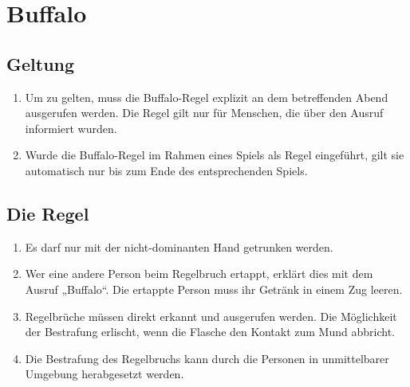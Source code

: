 \chapter{Buffalo}
\section{Geltung}
\begin{enumerate}[label={(\arabic*)}]
    \item
    Um zu gelten, muss die Buffalo-Regel explizit an dem betreffenden Abend ausgerufen werden.
    Die Regel gilt nur für Menschen, die über den Ausruf informiert wurden.

    \item
    Wurde die Buffalo-Regel im Rahmen eines Spiels als Regel eingeführt, gilt sie automatisch nur bis zum Ende des entsprechenden Spiels.
\end{enumerate}

\section{Die Regel}
\begin{enumerate}[label={(\arabic*)}]
    \item
    Es darf nur mit der nicht-dominanten Hand getrunken werden.

    \item
    Wer eine andere Person beim Regelbruch ertappt, erklärt dies mit dem Ausruf „Buffalo“.
    Die ertappte Person muss ihr Getränk in einem Zug leeren.

    \item
    Regelbrüche müssen direkt erkannt und ausgerufen werden.
    Die Möglichkeit der Bestrafung erlischt, wenn die Flasche den Kontakt zum Mund abbricht.

    \item
    Die Bestrafung des Regelbruchs kann durch die Personen in unmittelbarer Umgebung herabgesetzt werden.
\end{enumerate}
